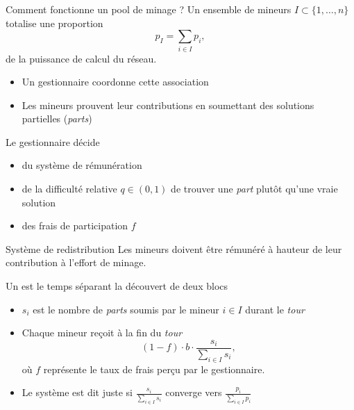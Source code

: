 \documentclass{beamer}
\begin{document}
\begin{frame}{Comment fonctionne un pool de minage ?}
\scriptsize
Un ensemble de mineurs $I\subset\{1,\ldots, n\}$ totalise une proportion 
$$
p_I = \sum_{i\in I }p_i,
$$
de la puissance de calcul du réseau. 
\begin{itemize}
  \item Un gestionnaire coordonne cette association
  \item Les mineurs prouvent leur contributions en soumettant des solutions partielles (\textit{parts})  
\end{itemize}
Le gestionnaire décide
\begin{itemize} 
  \item du système de rémunération
  \item de la difficulté relative $q\in(0,1)$ de trouver une \textit{part} plutôt qu'une vraie solution
  \item des frais de participation $f$
  \end{itemize} 
\end{frame}
\begin{frame}{Système de redistribution}
\scriptsize
Les mineurs doivent être rémunéré à hauteur de leur contribution à l'effort de minage. 
\begin{tcolorbox}[enhanced,drop shadow, title=Rémunération proportionnel]
Un  est le temps séparant la découvert de deux blocs 
\begin{itemize} 
  \item $s_i$ est le nombre de \textit{parts} soumis par le mineur $i\in I$ durant le \textit{tour}
  \item Chaque mineur reçoit à la fin du \textit{tour}
  $$
  (1-f)\cdot b\cdot\frac{s_i}{\sum_{i\in I}s_i},
  $$
  où $f$ représente le taux de frais perçu par le gestionnaire.
  \item Le système est dit juste si $\frac{s_i}{\sum_{i\in I}s_i}$ converge vers $\frac{p_i}{\sum_{i\in I}p_i}$
\end{itemize}

\end{tcolorbox}
\end{frame}
\end{document}
